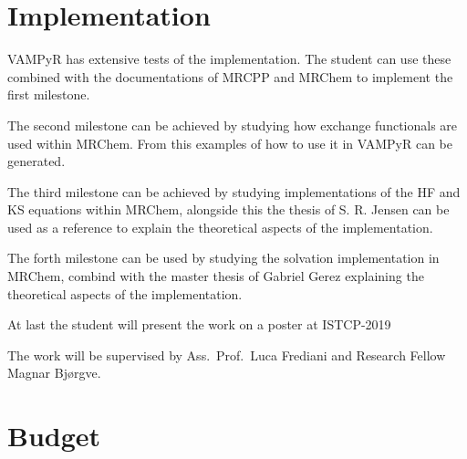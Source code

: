 \documentclass[12pt]{article}
\begin{document}
\section{Implementation}

VAMPyR has extensive tests of the implementation. The student can use these
combined with the documentations of \ac{MRCPP} and \ac{MRChem} to implement
the first milestone.

The second milestone can be achieved by studying how exchange functionals
are used within \ac{MRChem}. From this examples of how to use it in VAMPyR
can be generated.

The third milestone can be achieved by studying implementations of the
\ac{HF} and \ac{KS} equations within \ac{MRChem}, alongside this the
thesis of S. R. Jensen can be used as a reference to explain the
theoretical aspects of the implementation.

The forth milestone can be used by studying the solvation implementation
in \ac{MRChem}, combind with the master thesis of Gabriel Gerez explaining
the theoretical aspects of the implementation.

At last the student will present the work on a poster at ISTCP-2019


The work will be supervised by Ass.~Prof.~Luca Frediani and Research Fellow
Magnar Bj\o rgve.

\section{Budget}





\end{document}
